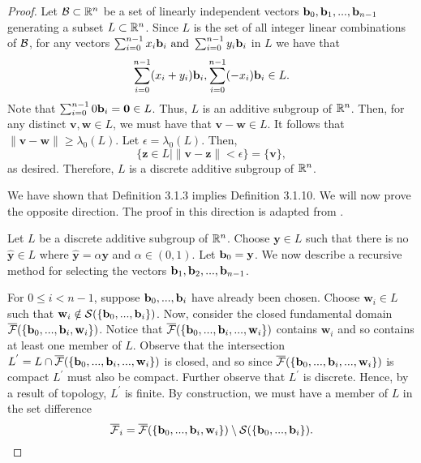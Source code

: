 \documentclass[a4paper,12pt]{article}
\begin{document}
\begin{proof}
Let $\mathcal{B} \subset \mathbb{R}^n$ be a set of linearly independent vectors $\mathbf{b}_0, \mathbf{b}_1, ..., \mathbf{b}_{n-1}$ generating a subset $L \subset \mathbb{R}^n$. Since $L$ is the set of all integer linear combinations of $\mathcal{B}$, for any vectors $\sum_{i=0}^{n-1} x_{i}\mathbf{b}_{i} \text{ and } \sum_{i=0}^{n-1} y_{i}\mathbf{b}_{i}$ in $L$ we have that $$\sum_{i=0}^{n-1} (x_{i} + y_{i})\mathbf{b}_i , \sum_{i=0}^{n-1} (-x_{i})\mathbf{b}_i \in L.$$ Note that $\sum_{i=0}^{n-1} 0\mathbf{b}_i = \mathbf{0} \in L$. Thus, $L$ is an additive subgroup of $\mathbb{R}^n$. Then, for any distinct $\mathbf{v}, \mathbf{w} \in L$, we must have that $\mathbf{v} - \mathbf{w} \in L$. It follows that $\| \mathbf{v} - \mathbf{w} \| \geq \lambda_{0}(L)$. Let $\epsilon = \lambda_{0}(L)$. Then, $$\lbrace \mathbf{z} \in L \mid \|\mathbf{v} - \mathbf{z}\| < \epsilon \rbrace = \lbrace \mathbf{v} \rbrace,$$ as desired. Therefore, $L$ is a discrete additive subgroup of $\mathbb{R}^n$. 

We have shown that Definition 3.1.3 implies Definition 3.1.10. We will now prove the opposite direction. The proof in this direction is adapted from \cite{VinodV}.


Let $L$ be a discrete additive subgroup of $\mathbb{R}^n$. Choose $\mathbf{y} \in L$ such that there is no $\hat{\mathbf{y}} \in L$ where $\hat{\mathbf{y}} = \alpha \mathbf{y}$ and $\alpha \in (0,1)$. Let $\mathbf{b}_0 = \mathbf{y}$. We now describe a recursive method for selecting the vectors $\mathbf{b}_1, \mathbf{b}_2, ..., \mathbf{b}_{n-1}$. 

For $0 \leq i < n-1$, suppose $\mathbf{b}_0, ..., \mathbf{b}_i$ have already been chosen. Choose $\mathbf{w}_i \in L$ such that $\mathbf{w}_i \notin \mathcal{S}(\lbrace \mathbf{b}_0,...,\mathbf{b}_i \rbrace)$. Now, consider the closed fundamental domain $\overline{\mathcal{F}}(\lbrace \mathbf{b}_0,...,\mathbf{b}_i,\mathbf{w}_i \rbrace)$. Notice that $\overline{\mathcal{F}}(\lbrace \mathbf{b}_0,...,\mathbf{b}_i,...,\mathbf{w}_i \rbrace)$ contains $\mathbf{w}_i$ and so contains at least one member of $L$. Observe that the intersection $L^{'} = L \cap \overline{\mathcal{F}}(\lbrace \mathbf{b}_0,...,\mathbf{b}_i,...,\mathbf{w}_i \rbrace)$ is closed, and so since $\overline{\mathcal{F}}(\lbrace \mathbf{b}_0,...,\mathbf{b}_i,...,\mathbf{w}_i \rbrace)$ is compact $L^'$ must also be compact. Further observe that $L^'$ is discrete. Hence, by a result of topology, $L^'$ is finite. By construction, we must have a member of $L$ in the set difference $$\overline{\mathcal{F}}_i = \overline{\mathcal{F}}(\lbrace \mathbf{b}_0,...,\mathbf{b}_i,\mathbf{w}_i \rbrace) \setminus \mathcal{S}(\lbrace \mathbf{b}_0,...,\mathbf{b}_i\rbrace).$$ 


\end{proof}
\end{document}
